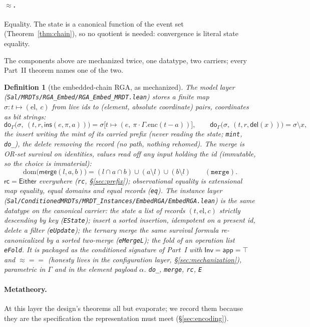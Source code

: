 \documentclass[11pt]{article}
\newtheorem{definition}[theorem]{Definition}
\newcommand{\rcrel}{\mathsf{rc}}                 %
\newcommand{\lean}[1]{\texttt{#1}}
\newcommand{\dodo}{\mathsf{do}}
\newcommand{\merge}{\mathsf{merge}}
\newcommand{\eqobs}{\approx}
\newcommand{\Inv}{\mathsf{Inv}}
\newcommand{\app}{\mathsf{app}}
\newcommand{\code}[1]{\texttt{#1}}
\newcommand{\del}{\mathsf{del}}
\newcommand{\ins}{\mathsf{ins}}
\newcommand{\Either}{\textsf{Either}}
\begin{document}
\paragraph{$\approx$.} Equality. The state is a canonical function of
the event set (Theorem~\ref{thm:chain}), so no quotient is needed:
convergence is literal state equality.

The components above are mechanized twice, one datatype, two
carriers; every Part~II theorem names one of the two.

\begin{definition}[the embedded-chain RGA, as mechanized]
\label{def:embed}
\emph{The model layer}
(\code{Sal/MRDTs/RGA\_Embed/RGA\_Embed\_MRDT.lean}) stores a finite
map $\sigma : t \mapsto (\mathrm{el},\ c)$ from live ids to (element,
absolute coordinate) pairs, coordinates as bit strings:
\[
  \dodo_\Gamma\bigl(\sigma,\ (t, r, \ins(e, \pi, a))\bigr)
  = \sigma\bigl[t \mapsto (e,\ \pi \cdot \Gamma.\mathrm{enc}(t -
  a))\bigr],
  \qquad
  \dodo_\Gamma\bigl(\sigma,\ (t, r, \del(x))\bigr) = \sigma \setminus x ,
\]
the insert writing the \emph{mint} of its carried prefix (never
reading the state; \lean{mint}, \lean{do\_}), the delete removing the
record (no path, nothing rehomed). The merge is OR-set survival on
identities, values read off any input holding the id (immutable, so
the choice is immaterial):
\[
  \mathrm{dom}\bigl(\merge(l, a, b)\bigr)
  = (l \cap a \cap b) \cup (a \setminus l) \cup (b \setminus l)
  \qquad (\lean{merge}) .
\]
$\rcrel = \Either$ everywhere (\lean{rc}, \S\ref{sec:prefix});
observational equality is extensional map equality, equal domains and
equal records (\lean{eq}). \emph{The instance layer}
(\code{Sal/ConditionedMRDTs/MRDT\_Instances/EmbedRGA/EmbedRGA.lean})
is the same datatype on the canonical carrier: the state a list of
records $(t, \mathrm{el}, c)$ strictly descending by key
(\lean{EState}); insert a sorted insertion, idempotent on a present
id, delete a filter (\lean{eUpdate}); the ternary merge the same
survival formula re-canonicalized by a sorted two-merge
(\lean{eMergeL}); the fold of an operation list \lean{eFold}. It is
packaged as the conditioned signature of Part~I with $\Inv = \app =
\top$ and ${\eqobs} = {=}$ (honesty lives in the configuration layer,
\S\ref{sec:mechanization}), parametric in $\Gamma$ and in the element
payload $\alpha$.
\hfill\lean{do\_}, \lean{merge}, \lean{rc}, \lean{E}
\end{definition}

\paragraph{Metatheory.} At this
layer the design's theorems all but evaporate; we record them because
they are the specification the representation must meet
(\S\ref{sec:encoding}).
\end{document}
